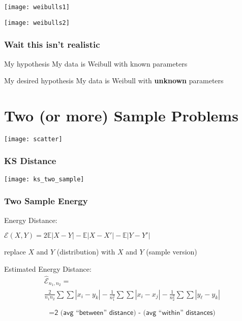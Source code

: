 \documentclass[presentation]{beamer}
\begin{document}
\begin{frame}
  \texttt{[image: weibulls1]} 
\end{frame}


\begin{frame}
  \texttt{[image: weibulls2]} 
\end{frame}

\begin{frame}
  \frametitle{Wait this isn't realistic}
  \begin{block}{My hypothesis}
    My data is Weibull with known parameters
  \end{block}
  \vskip 0.5in
  \begin{block}{My desired hypothesis}
    My data is Weibull with \textbf{unknown} parameters
  \end{block}
\end{frame}

\section{Two (or more) Sample Problems}

\begin{frame}
  \texttt{[image: scatter]}
\end{frame}

\begin{frame}
  \frametitle{KS Distance}
  \texttt{[image: ks\_two\_sample]}
\end{frame}

\begin{frame}
  \frametitle{Two Sample Energy}
  \begin{block}{Energy Distance:}
    \begin{center}
      $\mathcal{E}(X,Y) = 2\mathbb{E}|X - Y| - \mathbb{E}|X - X'| -
      \mathbb{E}|Y - Y'|$
    \end{center}
  \end{block}
  replace $X$ and $Y$ (distribution) with $X$ and $Y$ (sample version)
  \begin{block}{Estimated Energy Distance:}
    \begin{gather*}
      \hat{\mathcal{E}}_{n_1, n_2} = \\ \frac{2}{n_1 n_2} \sum \sum |x_i - y_k| -
      \frac{1}{n_1^2} \sum \sum |x_i - x_j| - \frac{1}{n_2^2} \sum \sum |y_\ell - y_k| 
    \end{gather*}
    
    \begin{displaymath}
      = \textsf{2 (avg ``between'' distance) - (avg ``within'' distances)}
    \end{displaymath}
  \end{block}
\end{frame}
\end{document}

